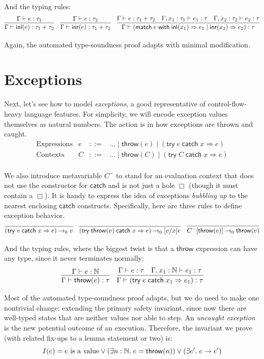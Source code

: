 \documentclass{amsbook}
\theoremstyle{definition}
\theoremstyle{remark}
\numberwithin{section}{chapter}
\numberwithin{equation}{chapter}
\begin{document}
And the typing rules:
$$\infer{\hasty{\Gamma}{\inl{e}}{\tau_1 + \tau_2}}{
  \hasty{\Gamma}{e}{\tau_1}
}
\quad \infer{\hasty{\Gamma}{\inr{e}}{\tau_1 + \tau_2}}{
  \hasty{\Gamma}{e}{\tau_2}
}
\quad \infer{\hasty{\Gamma}{\match{e}{x_1}{e_1}{x_2}{e_2}}{\tau}}{
  \hasty{\Gamma}{e}{\tau_1 + \tau_2}
  & \hasty{\Gamma, x_1 : \tau_1}{e_1}{\tau}
  & \hasty{\Gamma, x_2 : \tau_2}{e_2}{\tau}
}$$

Again, the automated type-soundness proof adapts with minimal modification.

\section{Exceptions}

\newcommand{\throw}[1]{\mathsf{throw}(#1)}
\newcommand{\catch}[3]{(\mathsf{try} \; #1 \; \mathsf{catch} \; #2 \Rightarrow #3)}

Next, let's see how to model \emph{exceptions}, a good representative of control-flow-heavy language features.
For simplicity, we will encode exception values themselves as natural numbers.
The action is in how exceptions are thrown and caught.
$$\begin{array}{rrcl}
  \textrm{Expressions} & e &::=& \ldots \mid \throw{e} \mid \catch{e}{x}{e} \\
  \textrm{Contexts} & C &::=& \ldots \mid \throw{C} \mid \catch{C}{x}{e} \\
\end{array}$$

We also introduce metavariable $C^-$ to stand for an evaluation context that does not use the constructor for $\mathsf{catch}$ and is not just a hole $\Box$ (though it must contain a $\Box$).
It is handy to express the idea of exceptions \emph{bubbling up} to the nearest enclosing $\mathsf{catch}$ constructs.
Specifically, here are three rules to define exception behavior.
$$\infer{\smallstepo{\catch{v}{x}{e}}{v}}{}
\quad \infer{\smallstepo{\catch{\throw{v}}{x}{e}}{\subst{e}{x}{v}}}{}
\quad \infer{\smallstepo{C^-[\throw{v}]}{\throw{v}}}{}$$

And the typing rules, where the biggest twist is that a $\mathsf{throw}$ expression can have any type, since it never terminates normally:
$$\infer{\hasty{\Gamma}{\throw{e}}{\tau}}{
  \hasty{\Gamma}{e}{\mathbb N}
}
\quad \infer{\hasty{\Gamma}{\catch{e}{x_1}{e_1}}{\tau}}{
  \hasty{\Gamma}{e}{\tau}
  & \hasty{\Gamma, x_1 : \mathbb N}{e_1}{\tau}
}$$

Most of the automated type-soundness proof adapts, but we do need to make one nontrivial change: extending the primary safety invariant, since now there are well-typed states that are neither values nor able to step.
An \emph{uncaught exception} is the new potential outcome of an execution.
Therefore, the invariant we prove (with related fix-ups to a lemma statement or two) is:
$$I(e) = \textrm{$e$ is a value} \lor (\exists n : \mathbb N. \; e = \throw{n}) \lor (\exists e'. \; \smallstep{e}{e'})$$
\end{document}
